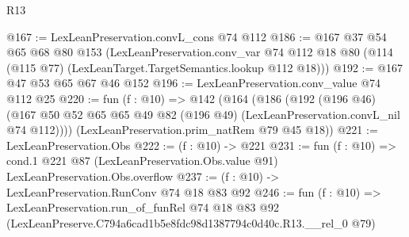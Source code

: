 \begin{lexlean}{R13}
\begin{coremodule}
@167 := LexLeanPreservation.convL_cons @74 @112
@186 := @167
    @37
    @54
    @65
    @68
    @80
    @153
    (LexLeanPreservation.conv_var
      @74
      @112
      @18
      @80
      (@114 (@115 @77) (LexLeanTarget.TargetSemantics.lookup @112 @18)))
@192 := @167 @47 @53 @65 @67 @46 @152
@196 := LexLeanPreservation.conv_value @74 @112 @25
@220 := fun (f : @10) =>
  @142
    (@164
      (@186
        (@192
          (@196 @46)
          (@167 @50 @52 @65 @65 @49 @82 (@196 @49) (LexLeanPreservation.convL_nil @74 @112))))
      (LexLeanPreservation.prim_natRem @79 @45 @18))
@221 := LexLeanPreservation.Obs
@222 := (f : @10) -> @221
@231 := fun (f : @10) =>
  cond.{1} @221 @87 (LexLeanPreservation.Obs.value @91) LexLeanPreservation.Obs.overflow
@237 := (f : @10) -> LexLeanPreservation.RunConv @74 @18 @83 @92
@246 := fun (f : @10) =>
  LexLeanPreservation.run_of_funRel
    @74
    @18
    @83
    @92
    (LexLeanPreserve.C794a6cad1b5e8fdc98d1387794c0d40c.R13.__rel_0 @79)
\end{coremodule}
\end{lexlean}
